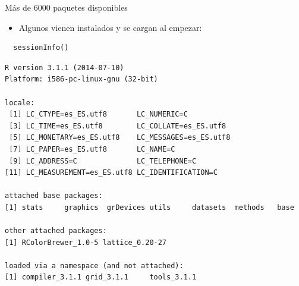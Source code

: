 \documentclass[xcolor={usenames,svgnames,dvipsnames}]{beamer}
\begin{document}
\begin{frame}[fragile,label=sec-1-3-3]{Más de 6000 paquetes disponibles}
 \begin{itemize}
\item Algunos vienen instalados y se cargan al empezar:
\end{itemize}
\lstset{language=R,label= ,caption= ,numbers=none}
\begin{lstlisting}
  sessionInfo()
\end{lstlisting}

\begin{verbatim}
R version 3.1.1 (2014-07-10)
Platform: i586-pc-linux-gnu (32-bit)

locale:
 [1] LC_CTYPE=es_ES.utf8       LC_NUMERIC=C             
 [3] LC_TIME=es_ES.utf8        LC_COLLATE=es_ES.utf8    
 [5] LC_MONETARY=es_ES.utf8    LC_MESSAGES=es_ES.utf8   
 [7] LC_PAPER=es_ES.utf8       LC_NAME=C                
 [9] LC_ADDRESS=C              LC_TELEPHONE=C           
[11] LC_MEASUREMENT=es_ES.utf8 LC_IDENTIFICATION=C      

attached base packages:
[1] stats     graphics  grDevices utils     datasets  methods   base     

other attached packages:
[1] RColorBrewer_1.0-5 lattice_0.20-27   

loaded via a namespace (and not attached):
[1] compiler_3.1.1 grid_3.1.1     tools_3.1.1
\end{verbatim}
\end{frame}
\end{document}
